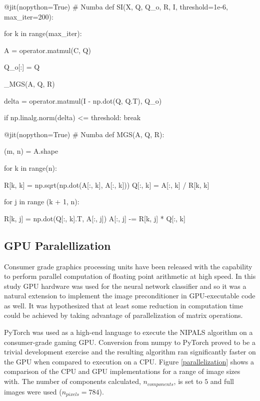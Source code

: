\documentclass[12pt]{article}
\begin{document}
\begin{lstlisting}[frame=none,caption={Calculating Principal Components with Eigenvalue Decomposition via Simultaneous Power Iteration},captionpos=b,label=lst:simuliter]
\end{lstlisting}
\begin{python}
@jit(nopython=True) # Numba
def SI(X, Q, Q_o, R, I, threshold=1e-6, max_iter=200): 

    for k in range(max_iter):

        A = operator.matmul(C, Q)

        Q_o[:] = Q

        _MGS(A, Q, R)

        delta = operator.matmul(I - np.dot(Q, Q.T), Q_o)
       
        if np.linalg.norm(delta) <= threshold:
            break
            
@jit(nopython=True) # Numba
def MGS(A, Q, R):

    (m, n) = A.shape

    for k in range(n):

        R[k, k] = np.sqrt(np.dot(A[:, k], A[:, k]))
        Q[:, k] = A[:, k] / R[k, k]

        for j in range (k + 1, n):

            R[k, j] = np.dot(Q[:, k].T, A[:, j])
            A[:, j] -= R[k, j] * Q[:, k]
\end{python}

\subsection{GPU Paralellization}\label{3.4}

Consumer grade graphics processing units have been released with the capability to perform parallel computation of floating point arithmetic at high speed. In this study GPU hardware was used for the neural network classifier and so it was a natural extension to implement the image preconditioner in GPU-executable code as well. It was hypothesized that at least some reduction in computation time could be achieved by taking advantage of parallelization of matrix operations. 

PyTorch was used as a high-end language to execute the NIPALS algorithm on a consumer-grade gaming GPU. Conversion from numpy to PyTorch proved to be a trivial development exercise and the resulting algorithm ran significantly faster on the GPU when compared to execution on a CPU. Figure \ref{parallelization} shows a comparison of the CPU and GPU implementations for a range of image sizes with. The number of components calculated, $n_{components}$, is set to $5$ and full images were used ($n_{pixels}=784$). 
\end{document}

